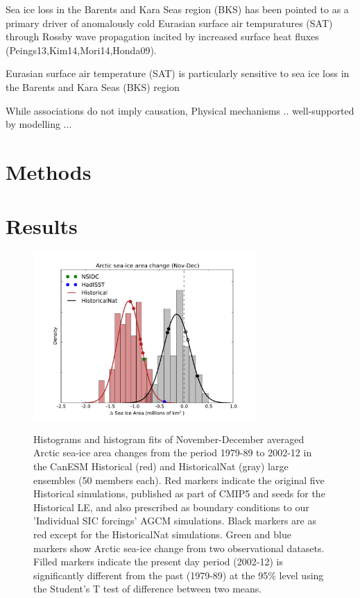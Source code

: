 \documentclass[grl]{AGUTeX}  %
\begin{document}
\begin{article}
Sea ice loss in the Barents and Kara Seas region (BKS) has been pointed to as a primary driver of anomalously cold Eurasian surface air tempuratures (SAT) through Rossby wave propagation incited by increased surface heat fluxes (Peings13,Kim14,Mori14,Honda09).

Eurasian surface air temperature (SAT) is particularly sensitive to sea ice loss in the Barents and Kara Seas (BKS) region

 While associations do not imply causation, Physical mechanisms   .. well-supported by modelling ...



\section{Methods}



\section{Results}



\begin{figure}[h!]
  \noindent\includegraphics[width=20pc,angle=0]{fig1.pdf} \\ 
  \caption{Histograms and histogram fits of November-December averaged Arctic sea-ice area changes from the period 1979-89 to 2002-12 in the CanESM Historical (red) and HistoricalNat (gray) large ensembles (50 members each). Red markers indicate the original five Historical simulations, published as part of CMIP5 and seeds for the Historical LE, and also prescribed as boundary conditions to our 'Individual SIC forcings' AGCM simulations. Black markers are as red except for the HistoricalNat simulations. Green and blue markers show Arctic sea-ice change from two observational datasets. Filled markers indicate the present day period (2002-12) is significantly different from the past (1979-89) at the 95\% level using the Student's T test of difference between two means.
}\label{fig:fig1}
\end{figure}


\end{article}
\end{document}
